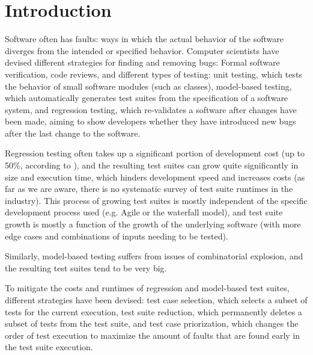 
\chapter{Introduction}\label{chapter:introduction}

Software often has faults: ways in which the actual behavior of the
software diverges from the intended or specified behavior. Computer
scientists have devised different strategies for finding and removing
bugs: Formal software verification, code reviews, and different types of
testing: unit testing, which tests the behavior of small software modules
(such as classes), model-based testing, which automatically generates
test suites from the specification of a software system, and regression
testing, which re-validates a software after changes have been made,
aiming to show developers whether they have introduced new bugs after
the last change to the software.


Regression testing often takes up a significant portion of development
cost (up to 50\%, according to \cite{ramler2006economic}), and the
resulting test suites can grow quite significantly in size and execution
time, which hinders development speed and increases costs (as far as we
are aware, there is no systematic survey of test suite runtimes in the
industry). This process of growing test suites is mostly independent
of the specific development process used (e.g. Agile or the waterfall
model), and test suite growth is mostly a function of the growth of the
underlying software (with more edge cases and combinations of inputs
needing to be tested).

Similarly, model-based testing suffers from issues of combinatorial explosion,
and the resulting test suites tend to be very big.

To mitigate the costs and runtimes of regression and model-based test
suites, different strategies have been devised: test case selection, which
selects a subset of tests for the current execution, test suite reduction,
which permanently deletes a subset of tests from the test suite, and test
case priorization, which changes the order of test execution to maximize
the amount of faults that are found early in the test suite execution.

